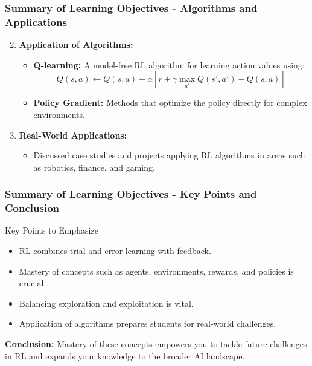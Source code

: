 \documentclass{beamer}
\begin{document}
\begin{frame}[fragile]
    \frametitle{Summary of Learning Objectives - Algorithms and Applications}
    \begin{enumerate}
        \setcounter{enumi}{1}
        \item \textbf{Application of Algorithms:}
        \begin{itemize}
            \item \textbf{Q-learning:} A model-free RL algorithm for learning action values using:
            \begin{equation}
                Q(s, a) \leftarrow Q(s, a) + \alpha \left[ r + \gamma \max_{a'} Q(s', a') - Q(s, a) \right]
            \end{equation}
            \item \textbf{Policy Gradient:} Methods that optimize the policy directly for complex environments.
        \end{itemize}
        
        \item \textbf{Real-World Applications:} 
        \begin{itemize}
            \item Discussed case studies and projects applying RL algorithms in areas such as robotics, finance, and gaming.
        \end{itemize}
    \end{enumerate}
\end{frame}

\begin{frame}[fragile]
    \frametitle{Summary of Learning Objectives - Key Points and Conclusion}
    \begin{block}{Key Points to Emphasize}
        \begin{itemize}
            \item RL combines trial-and-error learning with feedback.
            \item Mastery of concepts such as agents, environments, rewards, and policies is crucial.
            \item Balancing exploration and exploitation is vital.
            \item Application of algorithms prepares students for real-world challenges.
        \end{itemize}
    \end{block}
    
    \textbf{Conclusion:} Mastery of these concepts empowers you to tackle future challenges in RL and expands your knowledge to the broader AI landscape.
\end{frame}
\end{document}
